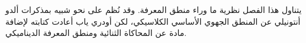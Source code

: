 \documentclass[../../../include/open-logic-chapter]{subfiles}
\begin{document}

\begin{editorial}
  يتناول هذا الفصل نظرية ما وراء منطق المعرفة. وقد نُظم على نحو شبيه
  بمذكرات ألدو أنتونيلي عن المنطق الجهوي الأساسي الكلاسيكي، لكن أودري ياب
  أعادت كتابته لإضافة مادة عن المحاكاة الثنائية ومنطق المعرفة الديناميكي.
\end{editorial}



\OLEndChapterHook
\end{document}
